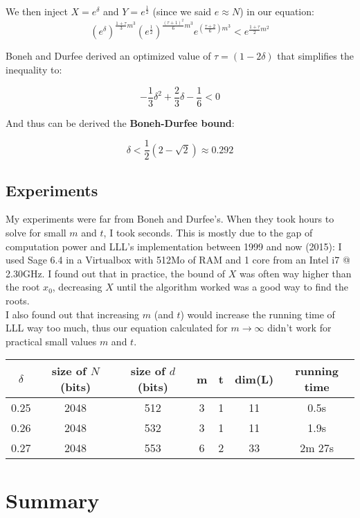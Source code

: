 \documentclass[a4paper,11pt]{article}
\begin{document}
We then inject $X = e^\delta$ and $Y = e^{\frac{1}{2}}$ (since we said $e \approx N$) in our equation:
\[ (e^\delta)^{\frac{1+\tau}{3}m^3} 
 (e^{\frac{1}{2}})^{\frac{(\tau+1)^2}{6} m^3}
  e^{(\frac{\tau+2}{6})m^3} < e^{\frac{1+\tau}{2}m^2} \]

Boneh and Durfee derived an optimized value of $\tau = (1 - 2\delta)$ that simplifies the inequality to:

\[ -\frac{1}{3}\delta^2 + \frac{2}{3} \delta -\frac{1}{6} < 0 \]

And thus can be derived the \textbf{Boneh-Durfee bound}:

\[ \delta < \frac{1}{2} (2 - \sqrt{2}) \approx 0.292 \]

\subsection{Experiments}\label{boneh-durfee-experiments}

My experiments were far from Boneh and Durfee's. When they took hours to solve for small $m$ and $t$, I took seconds. This is mostly due to the gap of computation power and LLL's implementation between 1999 and now (2015): I used Sage 6.4 in a Virtualbox with 512Mo of RAM and 1 core from an Intel i7 @ 2.30GHz. I found out that in practice, the bound of $X$ was often way higher than the root $x_0$, decreasing $X$ until the algorithm worked was a good way to find the roots.\\
I also found out that increasing $m$ (and $t$) would increase the running time of LLL way too much, thus our equation calculated for $m \rightarrow \infty$ didn't work for practical small values $m$ and $t$.

\begin{center} 
\begin{tabular}{@{} *7c @{}}
\toprule
 $\delta$ & size of $N$ (bits) & size of $d$ (bits) & m & t & dim(L) & running time \\ 
\midrule
 0.25 & 2048 & 512 & 3 & 1 & 11 & 0.5s\\ 
 0.26 & 2048 & 532 & 3 & 1 & 11 &  1.9s \\
 0.27 & 2048 & 553 & 6 & 2 & 33 & 2m 27s \\
\bottomrule
\end{tabular}
\end{center} 

\section{Summary}
\end{document}
